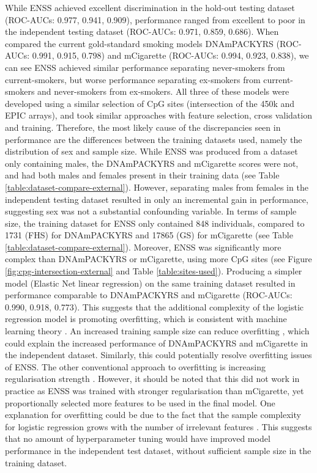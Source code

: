 \documentclass{article} %
\begin{document}
While ENSS achieved excellent discrimination in the hold-out testing dataset (ROC-AUCs: 0.977, 0.941, 0.909), performance ranged from excellent to poor in the independent testing dataset (ROC-AUCs: 0.971, 0.859, 0.686). When compared the current gold-standard smoking models DNAmPACKYRS (ROC-AUCs: 0.991, 0.915, 0.798) and mCigarette (ROC-AUCs: 0.994, 0.923, 0.838), we can see ENSS achieved similar performance separating never-smokers from current-smokers, but worse performance separating ex-smokers from current-smokers and never-smokers from ex-smokers. All three of these models were developed using a similar selection of CpG sites (intersection of the 450k and EPIC arrays), and took similar approaches with feature selection, cross validation and training. Therefore, the most likely cause of the discrepancies seen in performance are the differences between the training datasets used, namely the distribution of sex and sample size. While ENSS was produced from a dataset only containing males, the DNAmPACKYRS and mCigarette scores were not, and had both males and females present in their training data (see Table \ref{table:dataset-compare-external}). However, separating males from females in the independent testing dataset resulted in only an incremental gain in performance, suggesting sex was not a substantial confounding variable. In terms of sample size, the training dataset for ENSS only contained 848 individuals, compared to \num{1731} (FHS) for DNAmPACKYRS and \num{17865} (GS) for mCigarette (see Table \ref{table:dataset-compare-external}). Moreover, ENSS was significantly more complex than DNAmPACKYRS or mCigarette, using more CpG sites (see Figure \ref{fig:cpg-intersection-external} and Table \ref{table:sites-used}). Producing a simpler model (Elastic Net linear regression) on the same training dataset resulted in performance comparable to DNAmPACKYRS and mCigarette (ROC-AUCs: 0.990, 0.918, 0.773). This suggests that the additional complexity of the logistic regression model is promoting overfitting, which is consistent with machine learning theory \cite{bishop2006pattern}. An increased training sample size can reduce overfitting \cite{bishop2006pattern}, which could explain the increased performance of DNAmPACKYRS and mCigarette in the independent dataset. Similarly, this could potentially resolve overfitting issues of ENSS. The other conventional approach to overfitting is increasing regularisation strength \cite{buhlmann2011statistics}. However, it should be noted that this did not work in practice as ENSS was trained with stronger regularisation than mCigarette, yet proportionally selected more features to be used in the final model. One explanation for overfitting could be due to the fact that the sample complexity for logistic regression grows with the number of irrelevant features \cite{ng2004feature}. This suggests that no amount of hyperparameter tuning would have improved model performance in the independent test dataset, without sufficient sample size in the training dataset.
\end{document}
